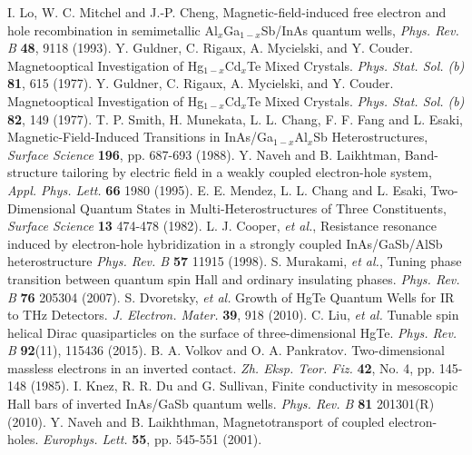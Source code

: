 \documentclass[titlepage,a4paper]{book}
\begin{document}
\begin{thebibliography}{199}
I. Lo, W. C. Mitchel and J.-P. Cheng, Magnetic-field-induced free electron and hole recombination in semimetallic Al$_x$Ga$_{1-x}$Sb/InAs quantum wells, \textit{Phys. Rev. B} \textbf{48}, 9118 (1993).
Y. Guldner, C. Rigaux, A. Mycielski, and Y. Couder. Magnetooptical Investigation of Hg$_{1-x}$Cd$_x$Te Mixed Crystals. \textit{Phys. Stat. Sol. (b)} \textbf{81}, 615 (1977).
Y. Guldner, C. Rigaux, A. Mycielski, and Y. Couder. Magnetooptical Investigation of Hg$_{1-x}$Cd$_x$Te Mixed Crystals. \textit{Phys. Stat. Sol. (b)} \textbf{82}, 149 (1977).
T. P. Smith, H. Munekata, L. L. Chang, F. F. Fang and L. Esaki, Magnetic-Field-Induced Transitions in InAs/Ga$_{1-x}$Al$_x$Sb Heterostructures, \textit{Surface Science} \textbf{196}, pp. 687-693 (1988).
Y. Naveh and B. Laikhtman, Band-structure tailoring by electric field in a weakly coupled electron-hole system, \textit{Appl. Phys. Lett.} \textbf{66} 1980 (1995).
E. E. Mendez, L. L. Chang and L. Esaki, Two-Dimensional Quantum States in Multi-Heterostructures of Three Constituents, \textit{Surface Science} \textbf{13} 474-478 (1982).
L. J. Cooper, \textit{et al.}, Resistance resonance induced by electron-hole hybridization in a strongly coupled InAs/GaSb/AlSb heterostructure \textit{Phys. Rev. B} \textbf{57} 11915 (1998).
S. Murakami, \textit{et al.}, Tuning phase transition between quantum spin Hall and ordinary insulating phases. \textit{Phys. Rev. B} \textbf{76} 205304 (2007).
S. Dvoretsky, \textit{et al.} Growth of HgTe Quantum Wells for IR to THz Detectors. \textit{J. Electron. Mater.} \textbf{39}, 918 (2010).
C. Liu, \textit{et al.} Tunable spin helical Dirac quasiparticles on the surface of three-dimensional HgTe. \textit{Phys. Rev. B} \textbf{92}(11), 115436 (2015). 
B. A. Volkov and O. A. Pankratov. Two-dimensional massless electrons in an inverted contact. \textit{Zh. Eksp. Teor. Fiz.} \textbf{42}, No. 4, pp. 145-148 (1985).
I. Knez, R. R. Du and G. Sullivan, Finite conductivity in mesoscopic Hall bars of inverted InAs/GaSb quantum wells. \textit{Phys. Rev. B} \textbf{81} 201301(R) (2010).
Y. Naveh and B. Laikhthman, Magnetotransport of coupled electron-holes. \textit{Europhys. Lett.} \textbf{55}, pp. 545-551 (2001).

\end{thebibliography}
\end{document}
